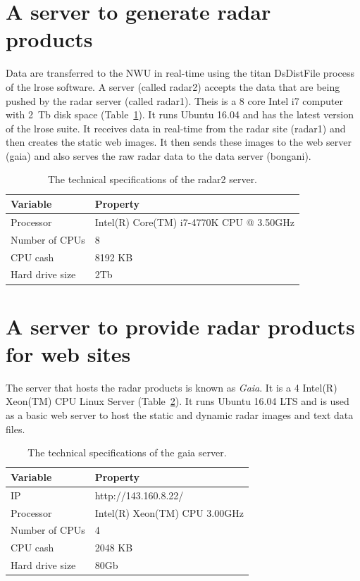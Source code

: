 \documentclass{wrcreport}
\begin{document}
\section{A server to generate radar products}
\label{sec:radar2}

Data are transferred to the NWU in real-time using the titan
DsDistFile process of the \gls{lrose} software. A server (called
radar2) accepts the data that are being pushed by the radar server
(called radar1). Theis is a 8 core Intel i7 computer with \SI{2}{Tb}
disk space (Table~\ref{table:radar2}). It runs Ubuntu 16.04 and has
the latest version of the \gls{lrose} suite. It receives data in
real-time from the radar site (radar1) and then creates the static web
images. It then sends these images to the web server (gaia) and also
serves the raw radar data to the data server (bongani).

\begin{table}[!htbp]
  \caption[The technical specifications of the radar2 server.]{The technical specifications of the radar2 server.}
  \label{table:radar2}
  \begin{center}
\begin{tabular}{l l} 
\toprule
\bfseries Variable & \bfseries Property \\
\midrule
Processor & Intel(R) Core(TM) i7-4770K CPU @ 3.50GHz \\
Number of CPUs & 8 \\
CPU cash &8192 KB \\
Hard drive size & 2Tb \\
\bottomrule
\end{tabular}
  \end{center}
\end{table}

\section{A server to provide radar products for web sites}

The server that hosts the radar products is known as \textit{Gaia}. It
is a 4 Intel(R) Xeon(TM) CPU Linux Server (Table~\ref{table:gaia}). It
runs Ubuntu 16.04 LTS and is used as a basic web server to host the
static and dynamic radar images and text data files.

\begin{table}[!htbp]
  \caption[The technical specifications of the gaia server.]{The technical specifications of the gaia server.}
  \label{table:gaia}
  \begin{center}
\begin{tabular}{l l} 
\toprule
\bfseries Variable & \bfseries Property \\
\midrule
IP & http://143.160.8.22/ \\
Processor & Intel(R) Xeon(TM) CPU 3.00GHz \\
Number of CPUs & 4 \\
CPU cash & 2048 KB \\
Hard drive size & 80Gb \\
\bottomrule
\end{tabular}
  \end{center}
\end{table}
\end{document}

